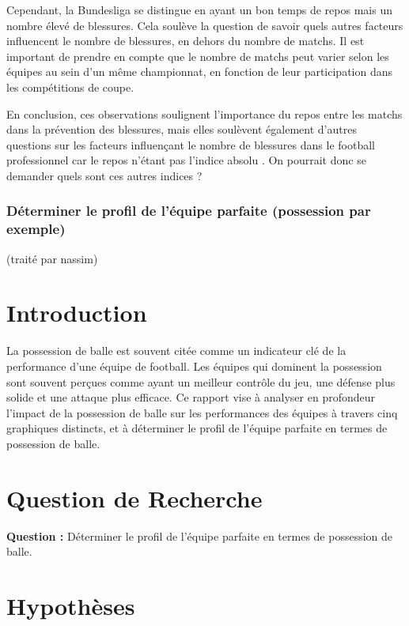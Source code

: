 \documentclass[
]{article}
\begin{document}
Cependant, la Bundesliga se distingue en ayant un bon temps de repos
mais un nombre élevé de blessures. Cela soulève la question de savoir
quels autres facteurs influencent le nombre de blessures, en dehors du
nombre de matchs. Il est important de prendre en compte que le nombre de
matchs peut varier selon les équipes au sein d'un même championnat, en
fonction de leur participation dans les compétitions de coupe.

En conclusion, ces observations soulignent l'importance du repos entre
les matchs dans la prévention des blessures, mais elles soulèvent
également d'autres questions sur les facteurs influençant le nombre de
blessures dans le football professionnel car le repos n'étant pas
l'indice absolu . On pourrait donc se demander quels sont ces autres
indices ?

\subsubsection{\texorpdfstring{\textbf{Déterminer le profil de l'équipe
parfaite (possession par
exemple)}}{Déterminer le profil de l'équipe parfaite (possession par exemple)}}\label{duxe9terminer-le-profil-de-luxe9quipe-parfaite-possession-par-exemple}

(traité par nassim)

\section{Introduction}\label{introduction-1}

La possession de balle est souvent citée comme un indicateur clé de la
performance d'une équipe de football. Les équipes qui dominent la
possession sont souvent perçues comme ayant un meilleur contrôle du jeu,
une défense plus solide et une attaque plus efficace. Ce rapport vise à
analyser en profondeur l'impact de la possession de balle sur les
performances des équipes à travers cinq graphiques distincts, et à
déterminer le profil de l'équipe parfaite en termes de possession de
balle.

\section{Question de Recherche}\label{question-de-recherche}

\textbf{Question :} Déterminer le profil de l'équipe parfaite en termes
de possession de balle.

\section{Hypothèses}\label{hypothuxe8ses}
\end{document}
